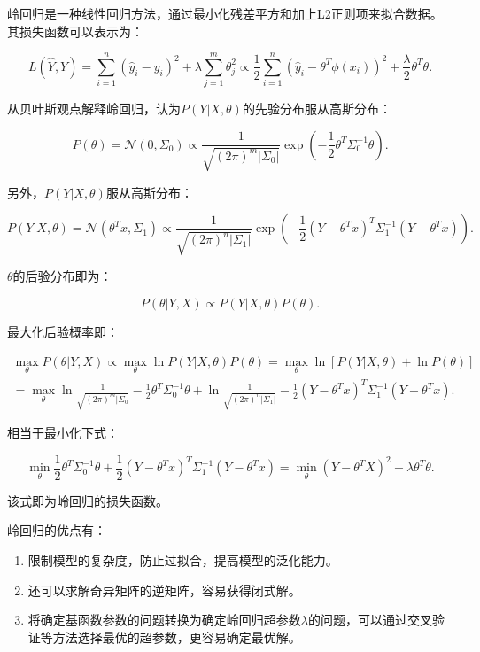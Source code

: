 \documentclass{article}
\begin{document}
岭回归是一种线性回归方法，通过最小化残差平方和加上L2正则项来拟合数据。其损失函数可以表示为：

\begin{equation}
    L(\hat{Y},Y)=\sum_{i=1}^{n}(\hat{y}_i-y_i)^2+\lambda\sum_{j=1}^{m}\theta_j^2\propto\frac12\sum_{i=1}^n(\hat{y}_i-\theta^T\phi(x_i))^2+\frac\lambda 2\theta^T\theta.
\end{equation}

从贝叶斯观点解释岭回归，认为$P(Y|X,\theta)$的先验分布服从高斯分布：

\begin{equation}
    P(\theta)=\mathcal{N}(0,\Sigma_0)\propto\frac{1}{\sqrt{(2\pi)^m|\Sigma_0|}}\exp(-\frac12\theta^T\Sigma_0^{-1}\theta).
\end{equation}

另外，$P(Y|X,\theta)$服从高斯分布：

\begin{equation}
    P(Y|X,\theta)=\mathcal{N}(\theta^Tx,\Sigma_1)\propto\frac{1}{\sqrt{(2\pi)^n|\Sigma_1|}}\exp(-\frac12(Y-\theta^Tx)^T\Sigma_1^{-1}(Y-\theta^Tx)).
\end{equation}

$\theta$的后验分布即为：

\begin{equation}
    P(\theta|Y,X)\propto P(Y|X,\theta)P(\theta).
\end{equation}

最大化后验概率即：

\begin{equation}
\begin{split}
    \max_\theta P(\theta|Y,X)\propto\max_\theta\ln P(Y|X,\theta)P(\theta)=\max_\theta\ln[P(Y|X,\theta)+\ln P(\theta)] \\
    =\max_\theta\ln\frac{1}{\sqrt{(2\pi)^m|\Sigma_0}}-\frac12\theta^T\Sigma_0^{-1}\theta+\ln\frac{1}{\sqrt{(2\pi)^n|\Sigma_1|}}-\frac12(Y-\theta^Tx)^T\Sigma_1^{-1}(Y-\theta^Tx).
\end{split}
\end{equation}

相当于最小化下式：

\begin{equation}
    \min_\theta\frac12\theta^T\Sigma_0^{-1}\theta+\frac12(Y-\theta^Tx)^T\Sigma_1^{-1}(Y-\theta^Tx)=\min_\theta(Y-\theta^TX)^2+\lambda\theta^T\theta.
\end{equation}

该式即为岭回归的损失函数。

岭回归的优点有：
\begin{enumerate}
    \item 限制模型的复杂度，防止过拟合，提高模型的泛化能力。
    \item 还可以求解奇异矩阵的逆矩阵，容易获得闭式解。
    \item 将确定基函数参数的问题转换为确定岭回归超参数$\lambda$的问题，可以通过交叉验证等方法选择最优的超参数，更容易确定最优解。
\end{enumerate}
\end{document}
